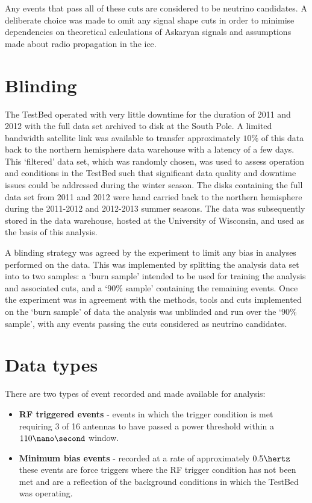 Any events that pass all of these cuts are considered to be neutrino candidates. A deliberate choice was made to omit any signal shape cuts in order to minimise dependencies on theoretical calculations of Askaryan signals and assumptions made about radio propagation in the ice. 




\section{Blinding}
\label{sec:Analysis:Blinding}
The TestBed operated with very little downtime for the duration of 2011 and 2012 with the full data set archived to disk at the South Pole. A limited bandwidth satellite link was available to transfer approximately $10 \%$ of this data back to the northern hemisphere data warehouse with a latency of a few days. This `filtered' data set, which was randomly chosen, was used to assess operation and conditions in the TestBed such that significant data quality and downtime issues could be addressed during the winter season. The disks containing the full data set from 2011 and 2012 were hand carried back to the northern hemisphere during the 2011-2012 and 2012-2013 summer seasons. The data was subsequently stored in the data warehouse, hosted at the University of Wisconsin, and used as the basis of this analysis.

A blinding strategy was agreed by the experiment to limit any bias in analyses performed on the data. This was implemented by splitting the analysis data set into to two samples: a `burn sample' intended to be used for training the analysis and associated cuts, and a `$90 \%$ sample' containing the remaining events. Once the experiment was in agreement with the methods, tools and cuts implemented on the `burn sample' of data the analysis was unblinded and run over the `$90 \%$ sample', with any events passing the cuts considered as neutrino candidates.

\section{Data types}
\label{sec:Analysis:Data-types}

There are two types of event recorded and made available for analysis:

\begin{itemize}

\item \textbf{RF triggered events} - events in which the trigger condition is met requiring 3 of 16 antennas to have passed a power threshold within a $110 \nano \second$ window.
\item \textbf{Minimum bias events} - recorded at a rate of approximately $0.5 \hertz$ these events are force triggers where the RF trigger condition has not been met and are a reflection of the background conditions in which the TestBed was operating.
\end{itemize}

